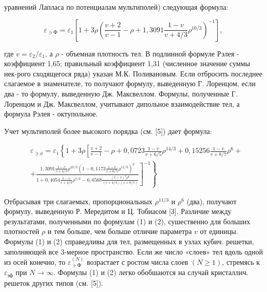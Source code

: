 \documentclass[10pt]{article}
\begin{document}
уравнений Лапласа по потенциалам мультиполей) следующая формула:



\[

\varepsilon_{\ni Ф}=\varepsilon_{1}\left[1+3 \rho\left(\frac{v+2}{v-1}-\rho+1,3091 \frac{1-v}{v+4 / 3} \rho^{10 / 3}\right)^{-1}\right],

\]



где $v=\varepsilon_{2} / \varepsilon_{1}$, а $\rho$ - объемная плотность тел. В подлинной формуле Рэлея - коэффициент 1,65; правильный коэффициент 1,31 (численное значение суммы нек-рого сходящегося ряда) указан М.К. Поливановым. Если отбросить последнее слагаемое в знаменателе, то получают формулу, выведенную Г. Лоренцом, если два - то формулу, выведенную Дж. Максвеллом. Формулы, полученные Г. Лоренцом и Дж. Максвеллом, учитывают дипольное взаимодействие тел, а формула Рэлея - октупольное.



Учет мультиполей более высокого порядка (см. [5]) дает формула:



\[

\begin{aligned}

& \varepsilon_{\ni \phi}=\varepsilon_{1}\left\{1+3 \rho\left[\frac{v+2}{v-1}-\rho+0,0723 \frac{1-v}{v+6 / 5} \rho^{14 / 3}+0,15256 \frac{1-v}{v+8 / 7} \rho^{6}+\right.\right. \\

&\left.\left.+\frac{1,3091 \frac{1-v}{v+4 / 3} \rho^{10 / 3}\left(1-0,1173 \frac{1-v}{v+6 / 5} \rho^{11 / 3}\right)^{2}}{1+0,4054 \frac{1-v}{v+4 / 3} \rho^{7 / 3}-6,6568 \frac{(1-v)^{2} \rho^{6}}{(v+4 / 3)(v+6 / 5)}}\right]^{-1}\right\}

\end{aligned}

\]



Отбрасывая три слагаемых, пропорциональных $\rho^{11 / 3}$ и $\rho^{6}$ (два), получают формулу, выведенную Р. Мередитом и Ц. Тобиасом [3]. Различие между результатами, полученными по формулам (1) и (2), сушественно для больших плотностей $\rho$ и тем больше, чем больше отличие параметра $v$ от единицы. Формулы (1) и (2) справедливы для тел, размещенных в узлах кубич. решетки, заполняющей все 3-мерное пространство. Если же число «слоев» тел вдоль одной из осей конечно, то $\varepsilon_{\ni Ф}^{(N)}$ возрастает с ростом числа слоев $(N \geqslant 1)$, стремясь к $\varepsilon_{э ф}$ при $N \rightarrow \infty$. Формулы (1) и (2) легко обобшаются на случай кристаллич. решеток других типов (см. [5]).
\end{document}
